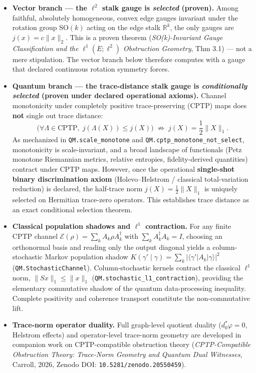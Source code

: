 \documentclass[
  11pt,
]{article}
\providecommand{\tightlist}{%
  \setlength{\itemsep}{0pt}\setlength{\parskip}{0pt}}
\providecommand{\tightlist}{%
  \setlength{\itemsep}{0pt}\setlength{\parskip}{0pt}}
\begin{document}
\begin{itemize}
\tightlist
\item
  \textbf{Vector branch --- the \(\ell^2\) stalk gauge is \emph{selected} (proven).} Among faithful, absolutely homogeneous, convex edge gauges invariant under the rotation group \(\mathrm{SO}(k)\) acting on the edge stalk \(\mathbb R^k\), the only gauges are \(j(x)=c\lVert x\rVert_2\). This is a proven theorem (\emph{SO(k)-Invariant Gauge Classification and the \(\ell^1(E;\ell^2)\) Obstruction Geometry}, Thm 3.1) --- not a mere stipulation. The vector branch below therefore computes with a gauge that declared continuous rotation symmetry forces.
\item
  \textbf{Quantum branch --- the trace-distance stalk gauge is \emph{conditionally selected} (proven under declared operational axioms).} Channel monotonicity under completely positive trace-preserving (CPTP) maps does \textbf{not} single out trace distance:
  \[ \big(\forall \Lambda \in \mathrm{CPTP},\; j(\Lambda(X)) \le j(X)\big) \;\not\Longrightarrow\; j(X) = \frac{1}{2}\|X\|_1. \]
  As mechanized in \texttt{QM.scale\_monotone} and \texttt{QM.cptp\_monotone\_not\_select}, monotonicity is scale-invariant, and a broad landscape of functionals (Petz monotone Riemannian metrics, relative entropies, fidelity-derived quantities) contract under CPTP maps. However, once the operational \textbf{single-shot binary discrimination axiom} (Holevo--Helstrom / classical total-variation reduction) is declared, the half-trace norm \(j(X) = \frac{1}{2}\|X\|_1\) is uniquely selected on Hermitian trace-zero operators. This establishes trace distance as an exact conditional selection theorem.
\item
  \textbf{Classical population shadows and \(\ell^1\) contraction.} For any finite CPTP channel \(\mathcal{E}(\rho) = \sum_k A_k \rho A_k^\dagger\) with \(\sum_k A_k^\dagger A_k = I\), choosing an orthonormal basis and reading only the output diagonal yields a column-stochastic Markov population shadow \(K(\gamma'\mid\gamma) = \sum_k |\langle\gamma'|A_k|\gamma\rangle|^2\) (\texttt{QM.StochasticChannel}). Column-stochastic kernels contract the classical \(\ell^1\) norm, \(\|S x\|_1 \le \|x\|_1\) (\texttt{QM.stochastic\_l1\_contraction}), providing the elementary commutative shadow of the quantum data-processing inequality. Complete positivity and coherence transport constitute the non-commutative lift.
\item
  \textbf{Trace-norm operator duality.} Full graph-level quotient duality (\(d_0^*\varphi = 0\), Helstrom effects) and operator-level trace-norm geometry are developed in companion work on CPTP-compatible obstruction theory (\emph{CPTP-Compatible Obstruction Theory: Trace-Norm Geometry and Quantum Dual Witnesses}, Carroll, 2026, Zenodo DOI: \texttt{10.5281/zenodo.20550459}).
\end{itemize}
\end{document}
